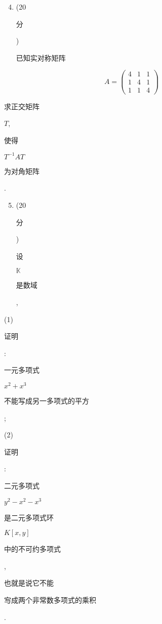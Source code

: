 \documentclass[10pt]{article}
\begin{document}
\begin{enumerate}
  \setcounter{enumi}{3}
  \item (20 \begin{CJK}{UTF8}{mj}分\end{CJK}) \begin{CJK}{UTF8}{mj}已知实对称矩阵\end{CJK}
\end{enumerate}
$$
A=\left(\begin{array}{lll}
4 & 1 & 1 \\
1 & 4 & 1 \\
1 & 1 & 4
\end{array}\right)
$$
\begin{CJK}{UTF8}{mj}求正交矩阵\end{CJK} $T$, \begin{CJK}{UTF8}{mj}使得\end{CJK} $T^{-1} A T$ \begin{CJK}{UTF8}{mj}为对角矩阵\end{CJK}.

\begin{enumerate}
  \setcounter{enumi}{4}
  \item (20 \begin{CJK}{UTF8}{mj}分\end{CJK}) \begin{CJK}{UTF8}{mj}设\end{CJK} $\mathbb{K}$ \begin{CJK}{UTF8}{mj}是数域\end{CJK},
\end{enumerate}
(1) \begin{CJK}{UTF8}{mj}证明\end{CJK}: \begin{CJK}{UTF8}{mj}一元多项式\end{CJK} $x^{2}+x^{3}$ \begin{CJK}{UTF8}{mj}不能写成另一多项式的平方\end{CJK};

(2) \begin{CJK}{UTF8}{mj}证明\end{CJK}: \begin{CJK}{UTF8}{mj}二元多项式\end{CJK} $y^{2}-x^{2}-x^{3}$ \begin{CJK}{UTF8}{mj}是二元多项式环\end{CJK} $K[x, y]$ \begin{CJK}{UTF8}{mj}中的不可约多项式\end{CJK}, \begin{CJK}{UTF8}{mj}也就是说它不能\end{CJK} \begin{CJK}{UTF8}{mj}㝍成两个非常数多项式的乘积\end{CJK}.
\end{document}
